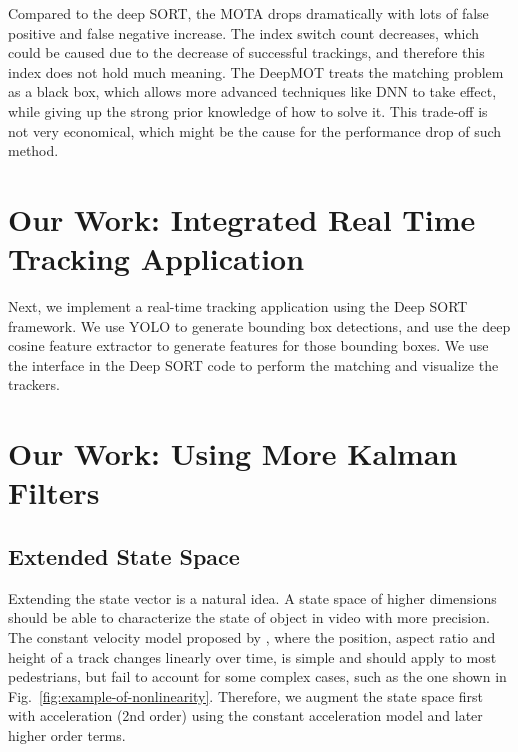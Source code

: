 \documentclass[conference]{IEEEtran}
\begin{document}
Compared to the deep SORT, the MOTA drops dramatically with lots of false positive and false negative increase.
The index switch count decreases, which could be caused due to the decrease of successful trackings, and therefore this index does not hold much meaning.
The DeepMOT treats the matching problem as a black box, which allows more advanced techniques like DNN to take effect, while giving up the strong prior knowledge of how to solve it.
This trade-off is not very economical, which might be the cause for the performance drop of such method.


\section{Our Work: Integrated Real Time Tracking Application}
Next, we implement a real-time tracking application using the Deep SORT framework.
We use YOLO to generate bounding box detections, and use the deep cosine feature extractor to generate features for those bounding boxes.
We use the interface in the Deep SORT code to perform the matching and visualize the trackers.

\section{Our Work: Using More Kalman Filters}
\label{sec:our-work}
\subsection{Extended State Space}

Extending the state vector is a natural idea. A state space of higher dimensions should be able to characterize the state of object in video with more precision. The constant velocity model proposed by \cite{Wojke2017simple}, where the position, aspect ratio and height of a track changes linearly over time, is simple and should apply to most pedestrians, but fail to account for some complex cases, such as the one shown in Fig.~\ref{fig:example-of-nonlinearity}. Therefore, we augment the state space first with acceleration (2nd order) using the constant acceleration model and later higher order terms.
\end{document}
